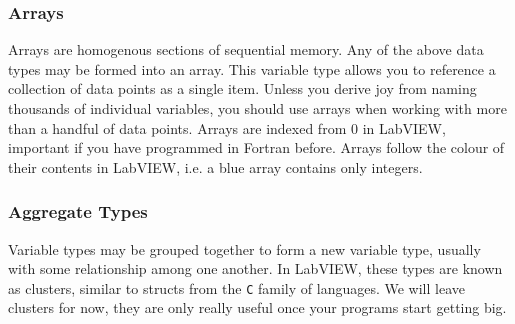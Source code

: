 	\subsubsection{Arrays}
	Arrays are homogenous sections of sequential memory. Any of the above data types may be formed into an array. This variable type allows you to reference a collection of data points as a single item. Unless you derive joy from naming thousands of individual variables, you should use arrays when working with more than a handful of data points. Arrays are indexed from 0 in LabVIEW, important if you have programmed in Fortran before. Arrays follow the colour of their contents in LabVIEW, i.e. a blue array contains only integers.
	\subsubsection{Aggregate Types}
	Variable types may be grouped together to form a new variable type, usually with some relationship among one another. In LabVIEW, these types are known as clusters, similar to structs from the \texttt{C} family of languages. We will leave clusters for now, they are only really useful once your programs start getting big.\\
	
